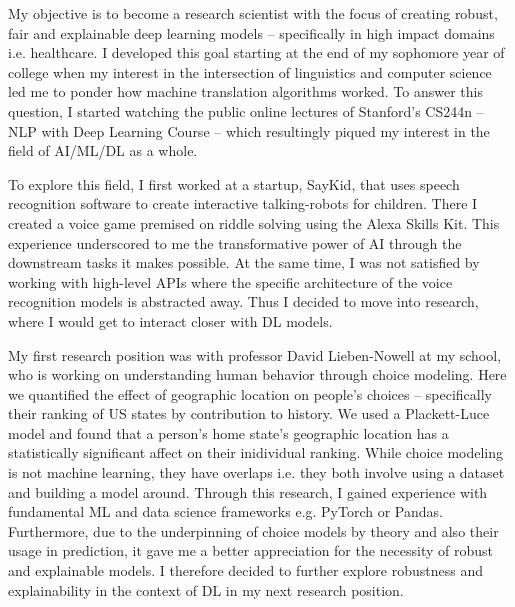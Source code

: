 \documentclass[12pt]{article}
\begin{document}








My objective is to become a research scientist with the focus of creating robust, fair and explainable deep learning models -- specifically in high impact domains i.e. healthcare. %
I developed this goal starting at the end of my sophomore year of college when my interest in the intersection of linguistics and computer science led me to ponder how machine translation algorithms worked. To answer this question, I started watching the public online lectures of Stanford's CS244n -- NLP with Deep Learning Course --  which resultingly piqued my interest in the field of AI/ML/DL as a whole. 

To explore this field, I first worked at a startup, SayKid, that uses speech recognition software to create interactive talking-robots for children. There I created a voice game premised on riddle solving using the Alexa Skills Kit. This experience underscored to me the transformative power of AI through the downstream tasks it makes possible. At the same time, I was not satisfied by working with high-level APIs where the specific architecture of the voice recognition models is abstracted away. Thus I decided to move into research, where I would get to interact closer with DL models.

My first research position was with professor David Lieben-Nowell at my school, who is working on understanding human behavior through choice modeling. Here we quantified the effect of geographic location on people's choices -- specifically their ranking of US states by contribution to history. We used a Plackett-Luce model and found that a person's home state's geographic location has a statistically significant affect on their inidividual ranking.
While choice modeling is not machine learning, they have overlaps i.e. they both involve using a dataset and building a model around. Through this research, I gained experience with fundamental ML and data science frameworks e.g. PyTorch or Pandas. 
Furthermore, due to the underpinning of choice models by theory and also their usage in prediction, it gave me a better appreciation for the necessity of robust and explainable models. I therefore decided to further explore robustness and explainability in the context of DL in my next research position.
\end{document}
